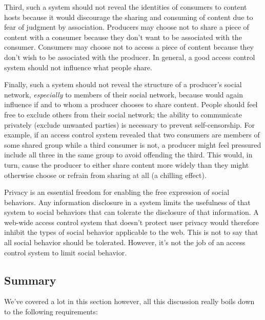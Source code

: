 \documentclass[pdftex,12pt,a4papaer,twoside,notitlepage]{report}
\begin{document}
Third, such a system should not reveal the identities of consumers to content
hosts because it would discourage the sharing and consuming of content due to
fear of judgment by association. Producers may choose not to share a piece of
content with a consumer because they don't want to be associated with the
consumer. Consumers may choose not to access a piece of content because they
don't wish to be associated with the producer. In general, a good access
control system should not influence what people share.

Finally, such a system should not reveal the structure of a producer's social
network, \emph{especially} to members of their social network, because would
again influence if and to whom a producer chooses to share content. People
should feel free to exclude others from their social network; the ability to
communicate privately (exclude unwanted parties) is necessary to prevent
self-censorship. For example, if an access control system revealed that two
consumers are members of some shared group while a third consumer is not, a
producer might feel pressured include all three in the same group to avoid
offending the third. This would, in turn, cause the producer to either share
content more widely than they might otherwise choose or refrain from sharing at
all (a chilling effect).

Privacy is an essential freedom for enabling the free expression of social
behaviors. Any information disclosure in a system limits the usefulness of that
system to social behaviors that can tolerate the disclosure of that information.
A web-wide access control system that doesn't protect user privacy would
therefore inhibit the types of social behavior applicable to the web. This is
not to say that all social behavior should be tolerated. However, it's not the
job of an access control system to limit social behavior.

\subsection{Summary}

We've covered a lot in this section however, all this discussion really boils
down to the following requirements:
\end{document}
